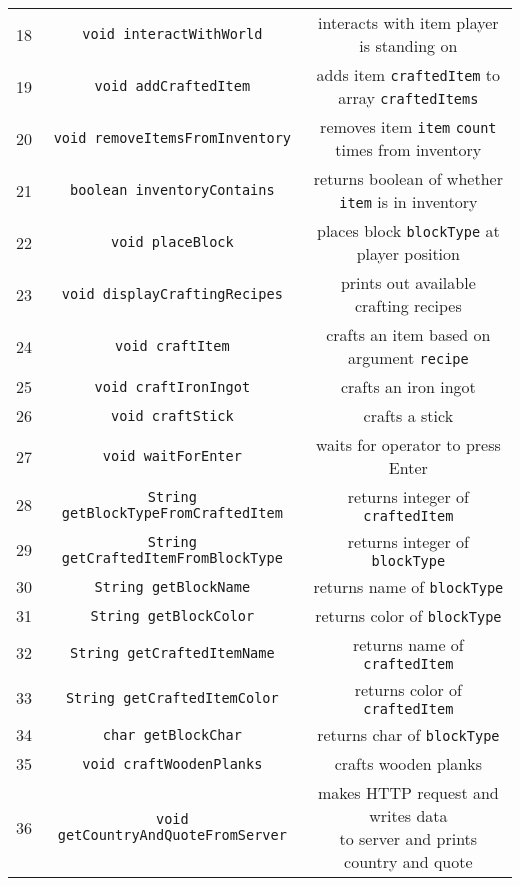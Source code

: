 \begin{table}[ht]
\begin{tabular}{ccc}
    18& \texttt{void interactWithWorld} & interacts with item player is standing on\\
    19& \texttt{void addCraftedItem} & adds item \texttt{craftedItem} to array \texttt{craftedItems} \\
    20& \texttt{void removeItemsFromInventory} & removes item \texttt{item} \texttt{count} times from inventory\\
    21& \texttt{boolean inventoryContains} & returns boolean of whether \texttt{item} is in inventory\\
    22& \texttt{void placeBlock} & places block \texttt{blockType} at player position\\
    23& \texttt{void displayCraftingRecipes} & prints out available crafting recipes\\
    24& \texttt{void craftItem} & crafts an item based on argument \texttt{recipe}\\
    25& \texttt{void craftIronIngot} & crafts an iron ingot\\
    26& \texttt{void craftStick} & crafts a stick\\
    27& \texttt{void waitForEnter} & waits for operator to press Enter\\
    28& \texttt{String getBlockTypeFromCraftedItem} & returns integer of \texttt{craftedItem}\\
    29& \texttt{String getCraftedItemFromBlockType} & returns integer of \texttt{blockType}\\
    30& \texttt{String getBlockName} & returns name of \texttt{blockType}\\
    31& \texttt{String getBlockColor} & returns color of \texttt{blockType}\\
    32& \texttt{String getCraftedItemName} & returns name of \texttt{craftedItem}\\
    33& \texttt{String getCraftedItemColor} & returns color of \texttt{craftedItem}\\
    34& \texttt{char getBlockChar} & returns char of \texttt{blockType}\\
    35& \texttt{void craftWoodenPlanks} & crafts wooden planks\\
    36& \texttt{void getCountryAndQuoteFromServer} & \makecell{makes HTTP request and writes data \\ to server and prints country and quote}\\
    \bottomrule
    \end{tabular}
    \label{table: style 2}
\end{table}